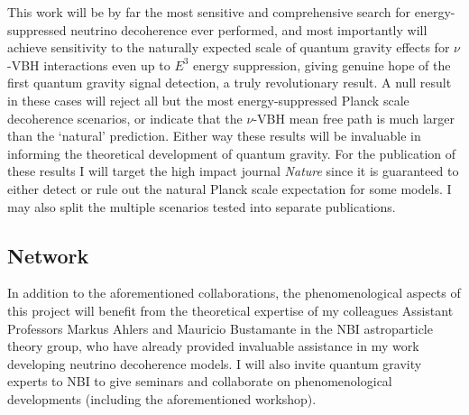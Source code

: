 \documentclass[a4paper,11pt]{article}
\begin{document}

This work will be by far the most sensitive and comprehensive search for energy-suppressed neutrino decoherence ever performed, and most importantly will achieve sensitivity to the naturally expected scale of quantum gravity effects for $\nu$-VBH interactions even up to $E^3$ energy suppression, giving genuine hope of the first quantum gravity signal detection, a truly revolutionary result. A null result in these cases will reject all but the most energy-suppressed Planck scale decoherence scenarios, or indicate that the $\nu$-VBH mean free path is much larger than the `natural' prediction. Either way these results will be invaluable in informing the theoretical development of quantum gravity. For the publication of these results I will target the high impact journal \textit{Nature} since it is guaranteed to either detect or rule out the natural Planck scale expectation for some models. I may also split the multiple scenarios tested into separate publications. \\




\subsection{Network}

In addition to the aforementioned collaborations, the phenomenological aspects of this project will benefit from the theoretical expertise of my colleagues Assistant Professors Markus Ahlers and Mauricio Bustamante in the NBI astroparticle theory group, who have already provided invaluable assistance in my work developing neutrino decoherence models. I will also invite quantum gravity experts to NBI to give seminars and collaborate on phenomenological developments (including the aforementioned workshop).
\end{document}
